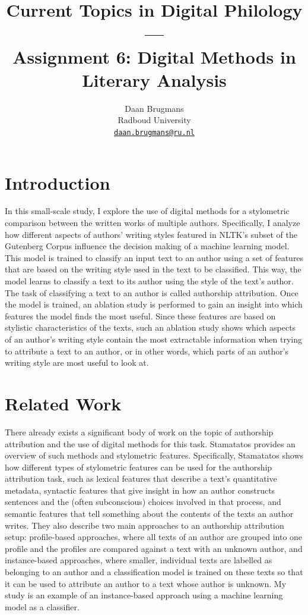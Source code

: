 \documentclass{article}
\title{Current Topics in Digital Philology --- \\Assignment 6: Digital Methods in Literary Analysis}
\author{%
  Daan Brugmans \\
  Radboud University\\
  \texttt{\url{daan.brugmans@ru.nl}} \\
}
\begin{document}


\maketitle

\section{Introduction}
In this small-scale study, I explore the use of digital methods for a stylometric comparison between the written works of multiple authors.
Specifically, I analyze how different aspects of authors' writing styles featured in NLTK's subset of the Gutenberg Corpus influence the decision making of a machine learning model.
This model is trained to classify an input text to an author using a set of features that are based on the writing style used in the text to be classified.
This way, the model learns to classify a text to its author using the style of the text's author.
The task of classifying a text to an author is called authorship attribution.
Once the model is trained, an ablation study is performed to gain an insight into which features the model finds the most useful.
Since these features are based on stylistic characteristics of the texts, such an ablation study shows which aspects of an author's writing style contain the most extractable information when trying to attribute a text to an author, or in other words, which parts of an author's writing style are most useful to look at.

\section{Related Work}
There already exists a significant body of work on the topic of authorship attribution and the use of digital methods for this task.
Stamatatos \cite{stamatatos2009surveymodern,stamatatos2016authorshipverification} provides an overview of such methods and stylometric features.
Specifically, Stamatatos shows how different types of stylometric features can be used for the authorship attribution task, such as lexical features that describe a text's quantitative metadata, syntactic features that give insight in how an author constructs sentences and the (often subconscious) choices involved in that process, and semantic features that tell something about the contents of the texts an author writes.
They also describe two main approaches to an authorship attribution setup: profile-based approaches, where all texts of an author are grouped into one profile and the profiles are compared against a text with an unknown author, and instance-based approaches, where smaller, individual texts are labelled as belonging to an author and a classification model is trained on these texts so that it can be used to attribute an author to a text whose author is unknown.
My study is an example of an instance-based approach using a machine learning model as a classifier.
\end{document}
